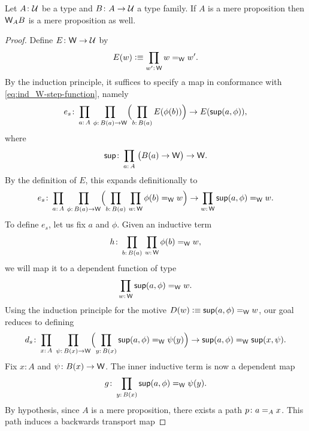 \begin{thm}\label{thm:W-mere-proposition}
    Let\/ $A\colon\univ$ be a type and\/ $B\colon A\to\univ$ a type family. If $A$ is a mere proposition then\/ $\mathsf{W}_AB$ is a mere proposition as well.
\end{thm}

\begin{proof}
    Define $E\colon\fun W\to\univ$ by
    \[
        E(w)\defeq\prod_{w'\colon\fun W}
            w\eq{\fun W}w'.
    \]
    By the induction principle, it suffices to specify a map in conformance with \eqref{eq:ind_W-step-function}, namely
    \[
        e_s\colon
            \prod_{a\colon A}\,
            \prod_{\phi\colon B(a)\to\fun W}
                \Bigl(
                    \prod_{b\colon B(a)}
                        E(\phi(b))
                \Bigr)
                \to
                E(\fun{sup}(a,\phi)),
    \]
    where
    \[
        \fun{sup}\colon
            \prod_{a\colon A}\;
            \bigl(
                B(a)\to\fun W
            \bigr)
            \to\fun W.
    \]
    By the definition of $E$, this expands definitionally to
    \[
        e_s\colon
            \prod_{a\colon A}\,
            \prod_{\phi\colon B(a)\to\fun W}
                \Bigl(
                    \prod_{b\colon B(a)}\,
                    \prod_{w\colon\fun W}
                        \phi(b)\eq{\fun W}w
                \Bigr)
                \to
                \prod_{w\colon\fun W}
                    \fun{sup}(a,\phi)\eq{\fun W}w.
    \]
    To define $e_s$, let us fix $a$ and $\phi$. Given an inductive term
    \[
        h\colon
            \prod_{b\colon B(a)}\,
            \prod_{w\colon\fun W}\phi(b)\eq{\fun W}w,
    \]
    we will map it to a dependent function of type
    \[
        \prod_{w\colon\fun W}
            \fun{sup}(a,\phi)\eq{\fun W}w.
    \]
    Using the induction principle for the motive $D(w)\mathrel{\vcentcolon}\equiv\mathsf{sup}(a,\phi)\mathrel{=_{\mathsf{W}}}w$, our goal reduces to defining
    \[
        d_s\colon
            \prod_{x\colon A}\;
            \prod_{\psi\colon B(x)\to\fun W}
            \Bigl(
                \prod_{y\colon B(x)}
                    \fun{sup}(a,\phi)
                    \eq{\fun W}
                    \psi(y)
            \Bigr)
            \to
                \fun{sup}(a,\phi)
                \eq{\fun W}
                \fun{sup}(x,\psi).
    \]
    Fix $x\colon A$ and $\psi\colon B(x)\to\fun W$. The inner inductive term is now a dependent map
    \[
        g\colon\prod_{y\colon B(x)}
            \fun{sup}(a,\phi)\eq{\fun W}\psi(y).
    \]
    By hypothesis, since $A$ is a mere proposition, there exists a path $p\colon a\eq{A}x$. This path induces a backwards transport map

\end{proof}

